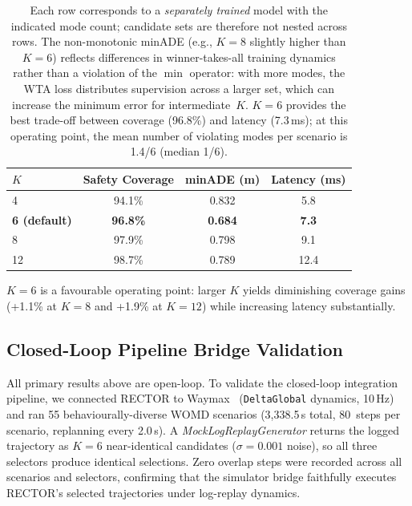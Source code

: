 \begin{table}[t]
\centering
\caption{Effect of Number of Modes K on Coverage and Efficiency}
\label{tab:k_sensitivity}
\begin{tabular}{lccc}
\toprule
\textbf{$K$} & \textbf{Safety Coverage} & \textbf{minADE (m)} & \textbf{Latency (ms)} \\
\midrule
4 & 94.1\% & 0.832 & 5.8 \\
\textbf{6 (default)} & \textbf{96.8\%} & \textbf{0.684} & \textbf{7.3} \\
8 & 97.9\% & 0.798 & 9.1 \\
12 & 98.7\% & 0.789 & 12.4 \\
\bottomrule
\end{tabular}
\vspace{1mm} \caption*{\footnotesize Each row corresponds to a \emph{separately trained} model with the indicated mode count; candidate sets are therefore not nested across rows.  The non-monotonic minADE (e.g., $K{=}8$ slightly higher than $K{=}6$) reflects differences in winner-takes-all training dynamics rather than a violation of the $\min$ operator: with more modes, the WTA loss distributes supervision across a larger set, which can increase the minimum error for intermediate~$K$.  $K{=}6$ provides the best trade-off between coverage (96.8\%) and latency (7.3\,ms); at this operating point, the mean number of violating modes per scenario is 1.4/6 (median 1/6).}
\end{table}

\noindent
$K{=}6$ is a favourable operating point: larger $K$ yields diminishing coverage gains (+1.1\% at $K{=}8$ and +1.9\% at $K{=}12$) while increasing
latency substantially.

\subsection{Closed-Loop Pipeline Bridge Validation}
\label{subsec:closed_loop}

All primary results above are open-loop.  To validate the closed-loop integration pipeline, we connected RECTOR to Waymax~\cite{gulino2024waymax} (\texttt{DeltaGlobal} dynamics, 10\,Hz) and ran 55 behaviourally-diverse WOMD scenarios (3{,}338.5\,s total, 80~steps per scenario, replanning every 2.0\,s).  A \emph{MockLogReplayGenerator} returns the logged trajectory as $K{=}6$ near-identical candidates ($\sigma{=}0.001$ noise), so all three selectors produce identical selections.  Zero overlap steps were recorded across all scenarios and selectors, confirming that the simulator bridge faithfully executes RECTOR's selected trajectories under log-replay dynamics.
